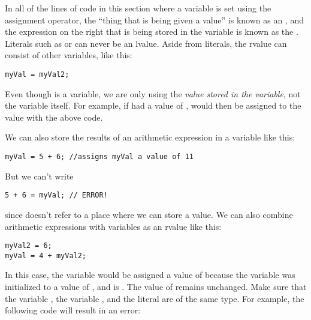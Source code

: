 In all of the lines of code in this section where a variable is set using the assignment operator, the ``thing that is being given a value'' is known as an , and the expression on the right that is being stored in the variable is known as the . 
Literals such as  or  can never be an lvalue. 
Aside from literals, the rvalue can consist of other variables, like this:

\noindent\begin{minipage}{\linewidth}\begin{lstlisting}
myVal = myVal2;
\end{lstlisting}\end{minipage}

Even though  is a variable, we are only using the \textit{value stored in the variable}, not the variable itself. 
For example, if  had a value of ,  would then be assigned to the value  with the above code. 

We can also store the results of an arithmetic expression in a variable like this: 

\noindent\begin{minipage}{\linewidth}\begin{lstlisting}
myVal = 5 + 6; //assigns myVal a value of 11
\end{lstlisting}\end{minipage}

But we can't write

\noindent\begin{minipage}{\linewidth}\begin{lstlisting}
5 + 6 = myVal; // ERROR!
\end{lstlisting}\end{minipage}

\noindent since  doesn't refer to a place where we can store a value. 
We can also combine arithmetic expressions with variables as an rvalue like this:

\noindent\begin{minipage}{\linewidth}\begin{lstlisting}
myVal2 = 6;
myVal = 4 + myVal2;
\end{lstlisting}\end{minipage}

In this case, the variable  would be assigned a value of  because the variable  was initialized to a value of , and  is .
The value of  remains unchanged. 
Make sure that the variable , the variable , and the literal  are of the same type. 
For example, the following code will result in an error:


